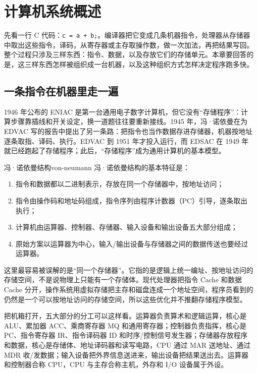 \section{计算机系统概述}

先看一行 C 代码：\texttt{c = a + b;}。编译器把它变成几条机器指令，处理器从存储器中取出这些指令，译码，从寄存器或主存取操作数，做一次加法，再把结果写回。整个过程只涉及三样东西：指令、数据，以及存放它们的存储单元。本章要回答的是，这三样东西怎样被组织成一台机器，以及这种组织方式怎样决定程序跑多快。

\subsection{一条指令在机器里走一遍}

1946 年公布的 ENIAC 是第一台通用电子数字计算机，但它没有“存储程序”：计算步骤靠插线和开关设定，换一道题往往要重新接线。1945 年，冯·诺依曼在为 EDVAC 写的报告中提出了另一条路：把指令也当作数据存进存储器，机器按地址逐条取指、译码、执行。EDVAC 到 1951 年才投入运行，而 EDSAC 在 1949 年就已经跑起了存储程序；此后，“存储程序”成为通用计算机的基本模型。

\begin{mydef}{冯·诺依曼结构}{von-neumann}
冯·诺依曼结构的基本特征是：
\begin{enumerate}
    \item 指令和数据都以二进制表示，存放在同一个存储器中，按地址访问；
    \item 指令由操作码和地址码组成，指令序列由程序计数器（PC）引导，逐条取出执行；
    \item 计算机由运算器、控制器、存储器、输入设备和输出设备五大部分组成；
    \item 原始方案以运算器为中心，输入/输出设备与存储器之间的数据传送也要经过运算器。
\end{enumerate}
\end{mydef}

这里最容易被误解的是“同一个存储器”。它指的是逻辑上统一编址、按地址访问的存储空间，不是说物理上只能有一个存储体。现代处理器把指令 Cache 和数据 Cache 分开，操作系统用虚拟存储把主存和磁盘连成一个地址空间，程序员看到的仍然是一个可以按地址访问的存储空间，所以这些优化并不推翻存储程序模型。

把机箱打开，五大部分的分工可以这样看。运算器负责算术和逻辑运算，核心是 ALU、累加器 ACC、乘商寄存器 MQ 和通用寄存器；控制器负责指挥，核心是 PC、指令寄存器 IR、指令译码器 ID 和时序/控制信号发生器；存储器存放程序和数据，核心是存储体、地址译码器和读写电路，CPU 通过 MAR 送地址、通过 MDR 收/发数据；输入设备把外界信息送进来，输出设备把结果送出去。运算器和控制器合称 CPU，CPU 与主存合称主机，外存和 I/O 设备属于外设。

